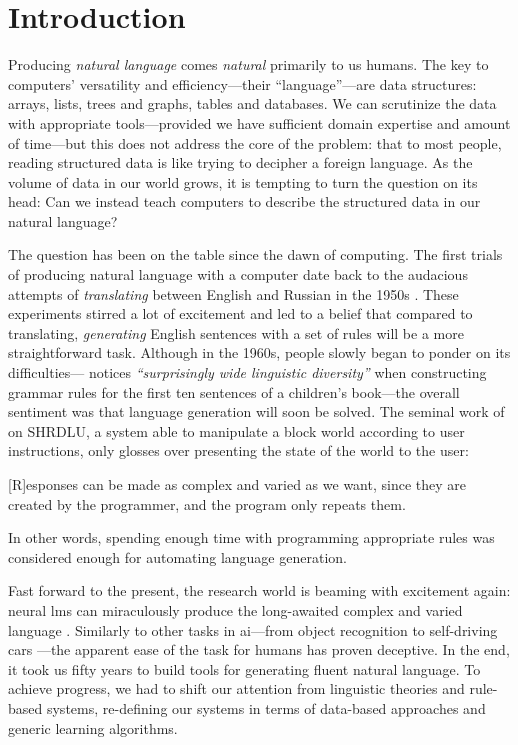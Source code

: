 \chapter{Introduction}
\label{chap:intro}
Producing \emph{natural language} comes \emph{natural} primarily to us humans.
The key to computers' versatility and efficiency---their ``language''---are data structures: arrays, lists, trees and graphs, tables and databases.
We can scrutinize the data with appropriate tools---provided we have sufficient domain expertise and amount of time---but this does not address the core of the problem: that to most people, reading structured data is like trying to decipher a foreign language. As the volume of data in our world grows, it is tempting to turn the question on its head: Can we instead teach computers to describe the structured data in our natural language?


The question has been on the table since the dawn of computing. The first trials of producing natural language with a computer date back to the audacious attempts of \emph{translating} between English and Russian in the 1950s \cite{sheridan1955research}. These experiments stirred a lot of excitement and led to a belief that compared to translating, \emph{generating} English sentences with a set of rules will be a more straightforward task. Although in the 1960s, people slowly began to ponder on its difficulties---\citet{yngve1961random} notices \emph{``surprisingly wide linguistic diversity''} when constructing grammar rules for the first ten sentences of a children's book---the overall sentiment was that language generation will soon be solved. The seminal work of \citet{winograd1971procedures} on SHRDLU, a system able to manipulate a block world according to user instructions, only glosses over presenting the state of the world to the user:
\begin{pquotation}{\citealp[p.384]{winograd1971procedures}}
    [R]esponses can be made as complex and varied as we want, since they are created by the programmer, and the program only repeats them.
\end{pquotation}
In other words, spending enough time with programming appropriate rules was considered enough for automating language generation.

Fast forward to the present, the research world is beaming with excitement again: neural \acp{lm} can miraculously produce the long-awaited complex and varied language \cite{radford2019language,brown2020language}. Similarly to other tasks in \ac{ai}---from object recognition \cite{papert1966summer} to self-driving cars \cite{autonomouscars}---the apparent ease of the task for humans has proven deceptive. In the end, it took us fifty years to build tools for generating fluent natural language. To achieve progress, we had to shift our attention from linguistic theories and rule-based systems, re-defining our systems in terms of data-based approaches and generic learning algorithms.

